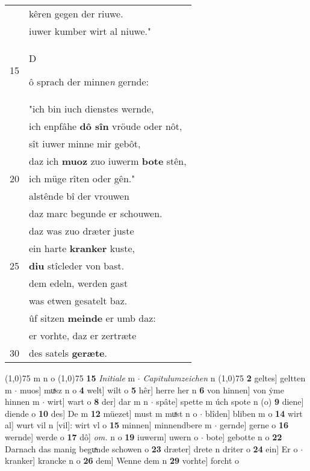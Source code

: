 \documentclass[8pt,a4paper,notitlepage]{article}
\begin{document}
\begin{table}[ht]
\begin{minipage}[t]{0.5\linewidth}
\begin{tabular}{rl}
 & kêren gegen der riuwe.\\ 
 & iuwer kumber wirt al niuwe."\\ 
15 & \begin{large}D\end{large}ô sprach der minne\textit{n} gernde:\\ 
 & "ich bin iuch dienstes wernde,\\ 
 & ich enpfâhe \textbf{dô sîn} vröude oder nôt,\\ 
 & sît iuwer minne mir gebôt,\\ 
 & daz ich \textbf{muoz} zuo iuwerm \textbf{bote} stên,\\ 
20 & ich müge rîten oder gên."\\ 
 & alstênde bî der vrouwen\\ 
 & daz marc begunde er schouwen.\\ 
 & daz was zuo dræter juste\\ 
 & ein harte \textbf{kranker} kuste,\\ 
25 & \textbf{diu} stîcleder von bast.\\ 
 & dem edeln, werden gast\\ 
 & was etwen gesatelt baz.\\ 
 & ûf sitzen \textbf{meinde} er umb daz:\\ 
 & er vorhte, daz er zertræte\\ 
30 & des satels \textbf{geræte}.\\ 
\end{tabular}
\scriptsize
\line(1,0){75} \newline
m n o \newline
\line(1,0){75} \newline
\textbf{15} \textit{Initiale} m   $\cdot$ \textit{Capitulumzeichen} n  \newline
\line(1,0){75} \newline
\textbf{2} geltes] geltten m  $\cdot$ muos] muͯsz n o \textbf{4} welt] wilt o \textbf{5} hêr] herre her n \textbf{6} von hinnen] von ẏme hinnen m  $\cdot$ wirt] wart o \textbf{8} der] dar m n  $\cdot$ spâte] spette m úch spote n (o) \textbf{9} diene] diende o \textbf{10} des] De m \textbf{12} müezet] must m muͯst n o  $\cdot$ blîden] bliben m o \textbf{14} wirt al] wurt vil n [vil]: wirt vl o \textbf{15} minnen] minnendbere m  $\cdot$ gernde] gerne o \textbf{16} wernde] werde o \textbf{17} dô] \textit{om.} n o \textbf{19} iuwerm] uwern o  $\cdot$ bote] gebotte n o \textbf{22} Darnach das manig beguͯnde schowen o \textbf{23} dræter] drete n driter o \textbf{24} ein] Er o  $\cdot$ kranker] krancke n o \textbf{26} dem] Wenne dem n \textbf{29} vorhte] forcht o \newline
\end{minipage}
\end{table}
\end{document}
